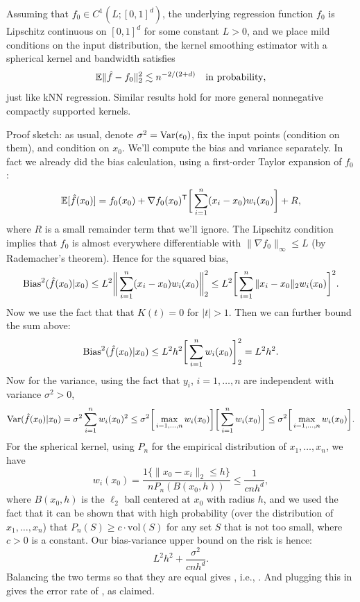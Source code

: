 \documentclass{article}
\begin{document}
Assuming that $f_0 \in C^1(L; [0,1]^d)$, the underlying regression function
$f_0$ is Lipschitz continuous on $[0,1]^d$ for some constant $L>0$, and we place
mild conditions on the input distribution, the kernel smoothing estimator with a  
spherical kernel and bandwidth  satisfies    
\begin{equation}
\label{eq:kernel_rate}
\mathbb{E}\|\hat{f} - f_0\|_2^2 \lesssim n^{-2/(2+d)} \quad \text{in probability},
\end{equation}
just like kNN regression. Similar results hold for more general nonnegative
compactly supported kernels.

Proof sketch: as usual, denote $\sigma^2 = \mathrm{Var}(\epsilon_0)$, fix the input
points (condition on them), and condition on $x_0$. We'll compute the bias and
variance separately. In fact we already did the bias calculation, using a
first-order Taylor expansion of $f_0$: 
\[
\mathbb{E}[\hat{f}(x_0)] = f_0(x_0) + \nabla f_0(x_0)^{\mathsf{T}} \bigg[\sum_{i=1}^n (x_i-x_0)
w_i(x_0) \bigg] + R,  
\]
where $R$ is a small remainder term that we'll ignore. The Lipschitz condition
implies that $f_0$ is almost everywhere differentiable with $\|\nabla
f_0\|_\infty \leq L$ (by Rademacher's theorem). Hence for the squared bias,
\[
\mathrm{Bias}^2(\hat{f}(x_0) | x_0) 
\leq L^2 \bigg\| \sum_{i=1}^n (x_i-x_0) w_i(x_0) \bigg\|_2^2 
\leq L^2 \bigg[ \sum_{i=1}^n \|x_i-x_0\|_2 w_i(x_0) \bigg]^2.
\]
Now we use the fact that that $K(t) = 0$ for $|t| > 1$. Then we can further
bound the sum above: 
\[
\mathrm{Bias}^2(\hat{f}(x_0) | x_0) 
\leq L^2 h^2 \bigg[ \sum_{i=1}^n w_i(x_0) \bigg]_2^2
= L^2 h^2.
\]
Now for the variance, using the fact that $y_i$, $i=1,\dots,n$ are independent
with variance $\sigma^2>0$,
\[
\mathrm{Var}(\hat{f}(x_0) | x_0) 
= \sigma^2 \sum_{i=1}^n w_i(x_0)^2 
\leq \sigma^2 \bigg[ \max_{i=1,\dots,n} w_i(x_0) \bigg] 
\bigg[ \sum_{i=1}^n w_i(x_0) \bigg]  
\leq \sigma^2 \bigg[ \max_{i=1,\dots,n} w_i(x_0) \bigg].
\]
For the spherical kernel, using $P_n$ for the empirical distribution of
$x_1,\dots,x_n$, we have  
\[
w_i(x_0) = \frac{1\{ \|x_0-x_i\|_2 \leq h \}}{n P_n(B(x_0, h)) } \leq
\frac{1}{cnh^d},
\]
where $B(x_0,h)$ is the $\ell_2$ ball centered at $x_0$ with radius $h$, and we
used the fact that it can be shown that with high probability (over the
distribution of $x_1,\dots,x_n$) that $P_n(S) \geq c \cdot \mathrm{vol}(S)$ for
any set $S$ that is not too small, where $c>0$ is a constant. Our bias-variance
upper bound on the risk is hence:
\[
L^2 h^2 + \frac{\sigma^2}{cnh^d}.
\]
Balancing the two terms so that they are equal gives , i.e., . And plugging this in gives
the error rate of , as claimed.   
\end{document}
